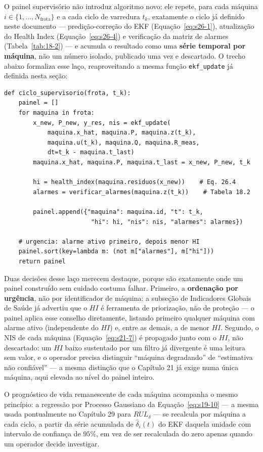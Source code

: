\documentclass[12pt,a4paper]{article}
\numberwithin{equation}{section}
\numberwithin{table}{section}
\numberwithin{figure}{section}
\begin{document}
{	O painel supervisório não introduz algoritmo novo: ele repete, para cada máquina $i \in \{1, \dots, N_{\text{frota}}\}$ e a cada ciclo de varredura $t_k$, exatamente o ciclo já definido neste documento — predição-correção do EKF (Equação~\eqref{eq:s26-1}), atualização do Health Index (Equação~\eqref{eq:s26-4}) e verificação da matriz de alarmes (Tabela~\ref{tab:18-2}) — e acumula o resultado como uma \textbf{série temporal por máquina}, não um número isolado, publicado uma vez e descartado. O trecho abaixo formaliza esse laço, reaproveitando a mesma função \texttt{ekf\_update} já definida nesta seção:

	\begin{verbatim}
def ciclo_supervisorio(frota, t_k):
    painel = []
    for maquina in frota:
        x_new, P_new, y_res, nis = ekf_update(
            maquina.x_hat, maquina.P, maquina.z(t_k),
            maquina.u(t_k), maquina.Q, maquina.R_meas,
            dt=t_k - maquina.t_last)
        maquina.x_hat, maquina.P, maquina.t_last = x_new, P_new, t_k

        hi = health_index(maquina.residuos(x_new))    # Eq. 26.4
        alarmes = verificar_alarmes(maquina.z(t_k))    # Tabela 18.2

        painel.append({"maquina": maquina.id, "t": t_k,
                        "hi": hi, "nis": nis, "alarmes": alarmes})

    # urgencia: alarme ativo primeiro, depois menor HI
    painel.sort(key=lambda m: (not m["alarmes"], m["hi"]))
    return painel
	\end{verbatim}

	Duas decisões desse laço merecem destaque, porque são exatamente onde um painel construído sem cuidado costuma falhar. Primeiro, a \textbf{ordenação por urgência}, não por identificador de máquina: a subseção de Indicadores Globais de Saúde já advertiu que o $HI$ é ferramenta de priorização, não de proteção — o painel aplica esse conselho diretamente, listando primeiro qualquer máquina com alarme ativo (independente do $HI$) e, entre as demais, a de menor $HI$. Segundo, o NIS de cada máquina (Equação~\eqref{eq:s21-7}) é propagado junto com o $HI$, não descartado: um $HI$ baixo sustentado por um filtro já divergente é uma leitura sem valor, e o operador precisa distinguir ``máquina degradando'' de ``estimativa não confiável'' — a mesma distinção que o Capítulo 21 já exige numa única máquina, aqui elevada ao nível do painel inteiro.

	O prognóstico de vida remanescente de cada máquina acompanha o mesmo princípio: a regressão por Processo Gaussiano da Equação~\eqref{eq:s19-10} — a mesma usada pontualmente no Capítulo 29 para $RUL_\delta$ — se recalcula por máquina a cada ciclo, a partir da série acumulada de $\hat\delta_i(t)$ do EKF daquela unidade com intervalo de confiança de $95\%$, em vez de ser recalculada do zero apenas quando um operador decide investigar.

}
\end{document}
